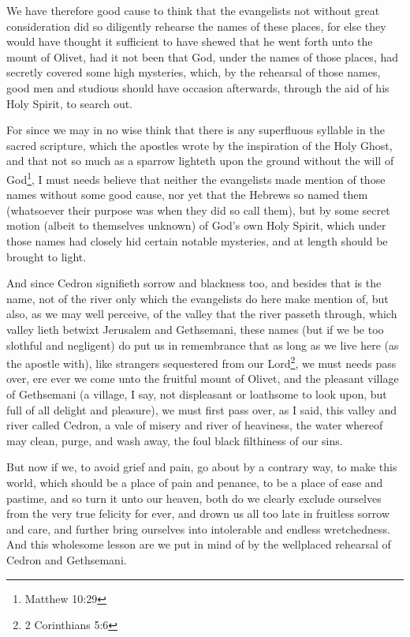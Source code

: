\documentclass[a5paper]{scrbook}
\begin{document}
	We have therefore good cause to think that the evangelists not without great consideration did so diligently rehearse the names of these places, for else they would have thought it sufficient to have shewed that he went forth unto the mount of Olivet, had it not been that God, under the names of those places, had secretly covered some high mysteries, which, by the rehearsal of those names, good men and studious should have occasion afterwards, through the aid of his Holy Spirit, to search out.
	
	For since we may in no wise think that there is any superfluous syllable in the sacred scripture, which the apostles wrote by the inspiration of the Holy Ghost, and that not so much as a sparrow lighteth upon the ground without the will of God\footnote{Matthew 10:29}, I must needs believe that neither the evangelists made mention of those names without some good cause, nor yet that the Hebrews so named them (whatsoever their purpose was when they did so call them), but by some secret motion (albeit to themselves unknown) of God's own Holy Spirit, which under those names had closely hid certain notable mysteries, and at length should be brought to light.
	
	And since Cedron signifieth sorrow and blackness too, and besides that is the name, not of the river only which the evangelists do here make mention of, but also, as we may well perceive, of the valley that the river passeth through, which valley lieth betwixt Jerusalem and Gethsemani, these names (but if we be too slothful and negligent) do put us in remembrance that as long as we live here (as the apostle with), like strangers sequestered from our Lord\footnote{2 Corinthians 5:6}, we must needs pass over, ere ever we come unto the fruitful mount of Olivet, and the pleasant village of Gethsemani (a village, I say, not displeasant or loathsome to look upon, but full of all delight and pleasure), we must first pass over, as I said, this valley and river called Cedron, a vale of misery and river of heaviness, the water whereof may clean, purge, and wash away, the foul black filthiness of our sins.
	
	But now if we, to avoid grief and pain, go about by a contrary way, to make this world, which should be a place of pain and penance, to be a place of ease and pastime, and so turn it unto our heaven, both do we clearly exclude ourselves from the very true felicity for ever, and drown us all too late in fruitless sorrow and care, and further bring ourselves into intolerable and endless wretchedness. And this wholesome lesson are we put in mind of by the wellplaced rehearsal of Cedron and Gethsemani.
	
\end{document}
